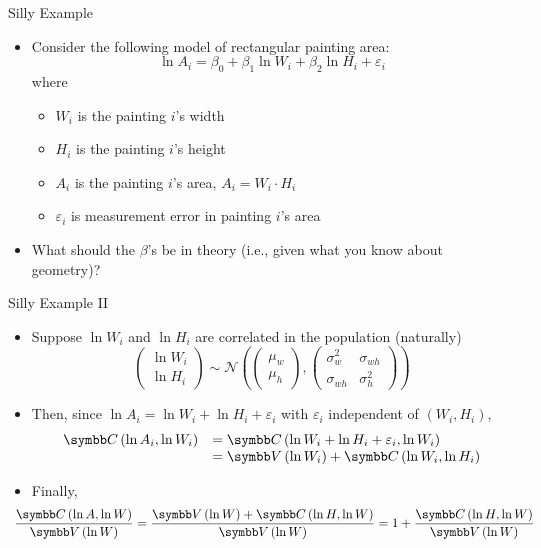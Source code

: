 \documentclass[aspectratio=169,11pt]{beamer}
\begin{document}
\begin{frame}{Silly Example}
	\begin{itemize}
	\item Consider the following model of rectangular painting area:\[
	\ln A_{i} = \beta_0 + \beta_{1} \ln W_{i} + \beta_{2} \ln H_{i} + \varepsilon_{i}
	\]
	where 
	\begin{itemize}
		\item $W_{i}$ is the painting $i$'s width
		\item $H_{i}$ is the painting $i$'s height
		\item $A_{i}$ is the painting $i$'s area, $A_{i} =W_{i} \cdot H_{i} $
		\item $\varepsilon_i$ is measurement error in painting $i$'s area
	\end{itemize}

	\medskip
	\item What should the $\beta$'s be in theory (i.e., given what you know about geometry)?
\end{itemize}
\end{frame}



\begin{frame}{Silly Example II}
	\begin{itemize}
	\item Suppose $\ln W_i$ and $\ln H_i$ are correlated in the population (naturally)\[
\left(\begin{array}{c}
\ln W_{i}\\
\ln H_{i}
\end{array}\right)\sim\mathcal{N}\left(\left(\begin{array}{c}
\mu_w\\
\mu_h
\end{array}\right),\left(\begin{array}{cc}
\sigma_{w}^{2} & \sigma_{wh}\\
\sigma_{wh} & \sigma_{h}^{2}
\end{array}\right)\right)
\]
	\smallskip
	\item Then, since $\ln A_{i} = \ln W_{i} + \ln H_{i} + \varepsilon_{i}$ with $\varepsilon_{i}$ independent of $\left(W_{i},H_{i}\right)$,\[
	\begin{array}{ll}
	\Cov\left( \ln A_{i}, \ln W_{i}\right) & = \Cov\left(\ln W_{i} + \ln H_{i} + \varepsilon_{i}, \ln W_{i}\right) \\
	& = \Var\left( \ln W_{i}\right) + \Cov\left(\ln W_{i}, \ln H_{i}\right) 
	\end{array}
	\]

	\smallskip
	\item Finally, \[
\hspace*{-.5cm}\frac{\Cov\left(\ln A,\ln W\right)}{\Var\left(\ln W\right)}=\frac{\Var\left(\ln W\right)+\Cov\left(\ln H,\ln W\right)}{\Var\left(\ln W\right)}=1+\frac{\Cov\left(\ln H,\ln W\right)}{\Var\left(\ln W\right)}
\]
\end{itemize}
\end{frame}
\end{document}
